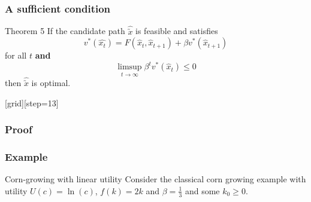 \documentclass[aspectratio=169]{beamer}
\begin{document}
\begin{frame}
\frametitle{A sufficient condition}
\begin{block}{Theorem 5}
If the candidate path $\hat{\utilde{x}}$ is feasible and satisfies 
\begin{equation*}
v^{*}(\hat{x_{t}}) = F(\hat{x}_{t}, \hat{x}_{t+1}) + \beta v^{*}(\hat{x}_{t+1})
\end{equation*}
for all $t$ \textbf{and}
\begin{equation*}
\limsup_{t \to \infty} \beta^{t}v^{*}(\hat{x}_{t}) \leq 0 
\end{equation*}
then $\hat{\utilde{x}}$ is optimal.
\end{block}
\end{frame}

{
[grid][step=13]

\begin{frame}
\frametitle{Proof}
\end{frame}

\begin{frame}[t]
\frametitle{Example}
\begin{block}{Corn-growing with linear utility}
Consider the classical corn growing example with utility $U(c)=\ln(c)$, $f(k)=2 k$ and $\beta= \frac{1}{3}$ and some $k_0 \geq 0$.
\end{block}
\end{frame}

}
\end{document}
